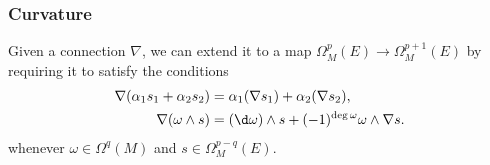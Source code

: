 \documentclass[a4paper]{article}
\begin{document}
%
%
%
%
%

\subsubsection*{Curvature}
Given a connection $\nabla$, we can extend it to a map $\Omega^p_M(E) \to \Omega^{p + 1}_M(E)$ by requiring it to satisfy the conditions
\begin{align*}
  \nabla (\alpha_1 s_1 + \alpha_2 s_2) &= \alpha_1( \nabla s_1) + \alpha_2 (\nabla s_2),\\
  \nabla (\omega \wedge s) &= (\d \omega) \wedge s + (-1)^{\deg \omega} \omega \wedge \nabla s.
\end{align*}
whenever $\omega \in \Omega^q(M)$ and $s \in \Omega_M^{p - q}(E)$.
\end{document}
